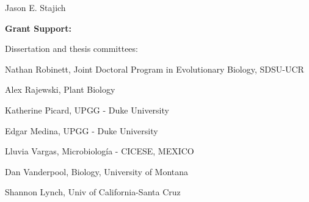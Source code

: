 \documentclass[10pt]{article}
\begin{document}
\begin{cv}{\centerline{Jason E. Stajich}}
\begin{cvlistcompact}{\bf Grant Support:}
\begin{cvlistcompact}{Dissertation and thesis committees:}
\item Nathan Robinett, Joint Doctoral Program in Evolutionary Biology, SDSU-UCR
\item Alex Rajewski, Plant Biology
\item Katherine Picard, UPGG - Duke University
\item Edgar Medina, UPGG - Duke University
\item Lluvia Vargas, Microbiolog\'{i}a - CICESE, MEXICO
\item Dan Vanderpool, Biology, University of Montana
\item Shannon Lynch, Univ of California-Santa Cruz
\end{cvlistcompact}

\end{cvlistcompact}


\end{cv}
\end{document}

